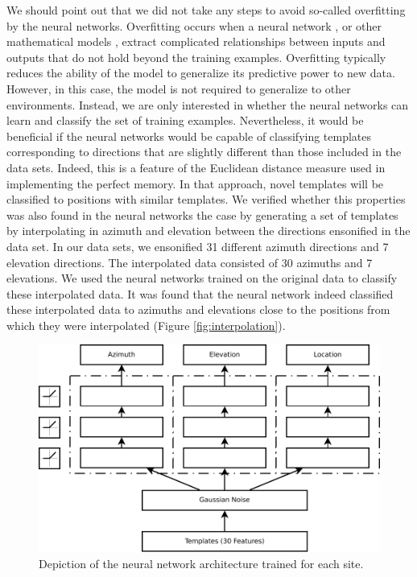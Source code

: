 \documentclass[preprint,5p]{elsarticle}
\begin{document}
We should point out that we did not take any steps to avoid so-called overfitting by the neural networks. Overfitting occurs when a neural network \citep{Ghotra2017}, or other mathematical models \citep{Hawkins2004}, extract complicated relationships between inputs and outputs that do not hold beyond the training examples. Overfitting typically reduces the ability of the model to generalize its predictive power to new data. However, in this case, the model is not required to generalize to other environments. Instead, we are only interested in whether the neural networks can learn and classify the set of training examples. Nevertheless, it would be beneficial if the neural networks would be capable of classifying templates corresponding to directions that are slightly different than those included in the data sets. Indeed, this is a feature of the Euclidean distance measure used in implementing the perfect memory. In that approach, novel templates will be classified to positions with similar templates. We verified whether this properties was also found in the neural networks the case by generating a set of templates by interpolating in azimuth and elevation between the directions ensonified in the data set. In our data sets, we ensonified 31 different azimuth directions and 7 elevation directions. The interpolated data consisted of 30 azimuths and 7 elevations. We used the neural networks trained on the original data to classify these interpolated data. It was found that the neural network indeed classified these interpolated data to azimuths and elevations close to the positions from which they were interpolated (Figure \ref{fig:interpolation}).

\begin{figure}
	\centering
	\includegraphics[width=1\linewidth]{figures/networks}
	\caption{Depiction of the neural network architecture trained for each site.}
	\label{fig:networks}
\end{figure}
\end{document}
